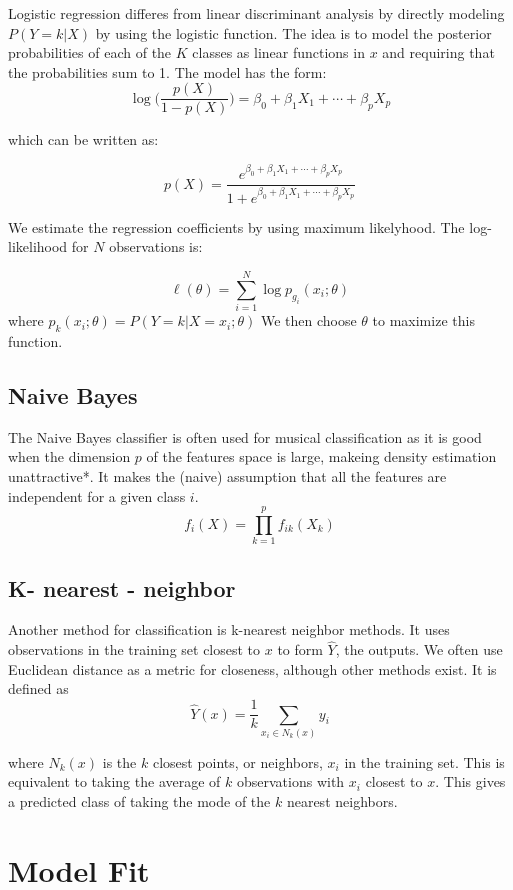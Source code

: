 \documentclass[12pt,twoside]{reedthesis}
\theoremstyle{definition}
\theoremstyle{definition}
\theoremstyle{definition}
\theoremstyle{remark}
\begin{document}
Logistic regression differes from linear discriminant analysis by
directly modeling \(P(Y = k|X)\) by using the logistic function. The
idea is to model the posterior probabilities of each of the \(K\)
classes as linear functions in \(x\) and requiring that the
probabilities sum to 1. The model has the form:
\[ \log \bigg( \frac{p(X)}{1-p(X)} \bigg) = \beta_0 + \beta_1 X_1 + \cdots + \beta_pX_p\]

which can be written as:

\[ p(X) = \frac{e^{\beta_0 + \beta_1X_1 + \cdots + \beta_pX_p}}{1 +e^{\beta_0 + \beta_1X_1 + \cdots + \beta_pX_p} }\]

We estimate the regression coefficients by using maximum likelyhood. The
log-likelihood for \(N\) observations is:

\[ \ell(\theta) = \sum_{i = 1}^N \log p_{g_i}(x_i;\theta)\] where
\(p_k(x_i;\theta) = P(Y = k|X = x_i;\theta)\) We then choose \(\theta\)
to maximize this function.

\section{Naive Bayes}\label{naive-bayes}

The Naive Bayes classifier is often used for musical classification as
it is good when the dimension \(p\) of the features space is large,
makeing density estimation unattractive*. It makes the (naive)
assumption that all the features are independent for a given class
\(i\). \[f_i(X) = \prod_{k = 1}^p f_{ik}(X_k)\]

\section{K- nearest - neighbor}\label{k--nearest---neighbor}

Another method for classification is k-nearest neighbor methods. It uses
observations in the training set closest to \(x\) to form \(\hat{Y}\),
the outputs. We often use Euclidean distance as a metric for closeness,
although other methods exist. It is defined as
\[ \hat{Y}(x) = \frac{1}{k}\sum_{x_i \in N_k(x)}y_i\]

where \(N_k(x)\) is the \(k\) closest points, or neighbors, \(x_i\) in
the training set. This is equivalent to taking the average of \(k\)
observations with \(x_i\) closest to \(x\). This gives a predicted class
of taking the mode of the \(k\) nearest neighbors.

\chapter{Model Fit}\label{model-fit}
\end{document}
